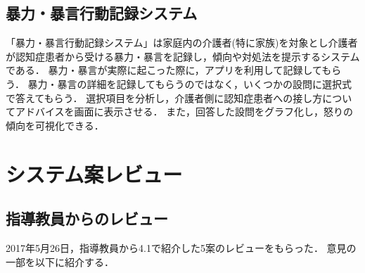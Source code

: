 \documentclass[../report]{subfiles}
\begin{document}
\subsection{暴力・暴言行動記録システム}
「暴力・暴言行動記録システム」は家庭内の介護者(特に家族)を対象とし介護者が認知症患者から受ける暴力・暴言を記録し，傾向や対処法を提示するシステムである．
暴力・暴言が実際に起こった際に，アプリを利用して記録してもらう．
暴力・暴言の詳細を記録してもらうのではなく，いくつかの設問に選択式で答えてもらう．
選択項目を分析し，介護者側に認知症患者への接し方についてアドバイスを画面に表示させる．
また，回答した設問をグラフ化し，怒りの傾向を可視化できる．


\section{システム案レビュー} \label{sec:4_hyouka_before}
\subsection{指導教員からのレビュー}
2017年5月26日，指導教員から4.1で紹介した5案のレビューをもらった．
意見の一部を以下に紹介する．
\end{document}
